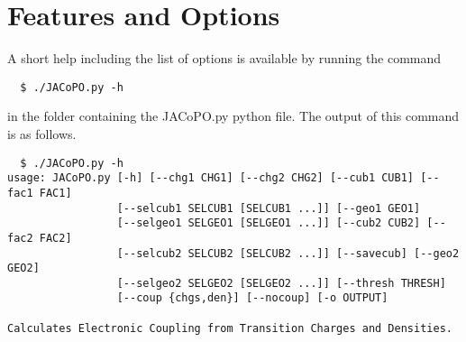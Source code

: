 \documentclass[a4paper]{article}
\begin{document}
\section{Features and Options}
\label{Options}
A short help including the list of options is available by running the command

\begin{verbatim}
  $ ./JACoPO.py -h
\end{verbatim}

in the folder containing the JACoPO.py python file. The output of this command is as follows.

\begin{verbatim}
  $ ./JACoPO.py -h
usage: JACoPO.py [-h] [--chg1 CHG1] [--chg2 CHG2] [--cub1 CUB1] [--fac1 FAC1]
                 [--selcub1 SELCUB1 [SELCUB1 ...]] [--geo1 GEO1]
                 [--selgeo1 SELGEO1 [SELGEO1 ...]] [--cub2 CUB2] [--fac2 FAC2]
                 [--selcub2 SELCUB2 [SELCUB2 ...]] [--savecub] [--geo2 GEO2]
                 [--selgeo2 SELGEO2 [SELGEO2 ...]] [--thresh THRESH]
                 [--coup {chgs,den}] [--nocoup] [-o OUTPUT]

Calculates Electronic Coupling from Transition Charges and Densities.


\end{verbatim}
\end{document}
